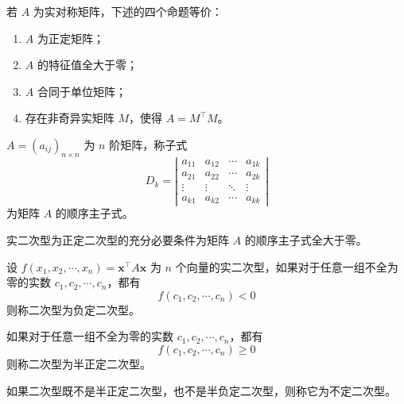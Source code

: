 \documentclass{ctexbook}
\begin{document}
\begin{theorem}[正定矩阵等价]
    若 $A$ 为实对称矩阵，下述的四个命题等价：
    \begin{enumerate}
        \item $A$ 为正定矩阵；
        \item $A$ 的特征值全大于零；
        \item $A$ 合同于单位矩阵；
        \item 存在非奇异实矩阵 $M$，使得 $A=M^\top M$。
    \end{enumerate}
\end{theorem}

\begin{definition}[顺序主子式]
    $A=(a_{ij})_{n\times n}$ 为 $n$ 阶矩阵，称子式
    \begin{equation}
        D_k=\left|\begin{matrix}
            a_{11} & a_{12} & \cdots & a_{1k}\\
            a_{21} & a_{22} & \cdots & a_{2k}\\
            \vdots & \vdots & \ddots & \vdots\\
            a_{k1} & a_{k2} & \cdots & a_{kk}
        \end{matrix}\right|
    \end{equation}
    为矩阵 $A$ 的顺序主子式。
\end{definition}

\begin{theorem}[顺序主子式全大于零]
    实二次型为正定二次型的充分必要条件为矩阵 $A$ 的顺序主子式全大于零。
\end{theorem}

\begin{definition}[负定二次型]
    设 $f(x_1,x_2,\cdots,x_n)=\boldsymbol{x}^\top A\boldsymbol{x}$ 为 $n$ 个向量的实二次型，如果对于任意一组不全为零的实数 $c_1,c_2,\cdots,c_n$，都有
    \begin{equation}
        f(c_1,c_2,\cdots,c_n)<0
    \end{equation}
    则称二次型为负定二次型。

    如果对于任意一组不全为零的实数 $c_1,c_2,\cdots,c_n$，都有
    \begin{equation}
        f(c_1,c_2,\cdots,c_n)\geq 0
    \end{equation}
    则称二次型为半正定二次型。

    如果二次型既不是半正定二次型，也不是半负定二次型，则称它为不定二次型。
\end{definition}
\end{document}
